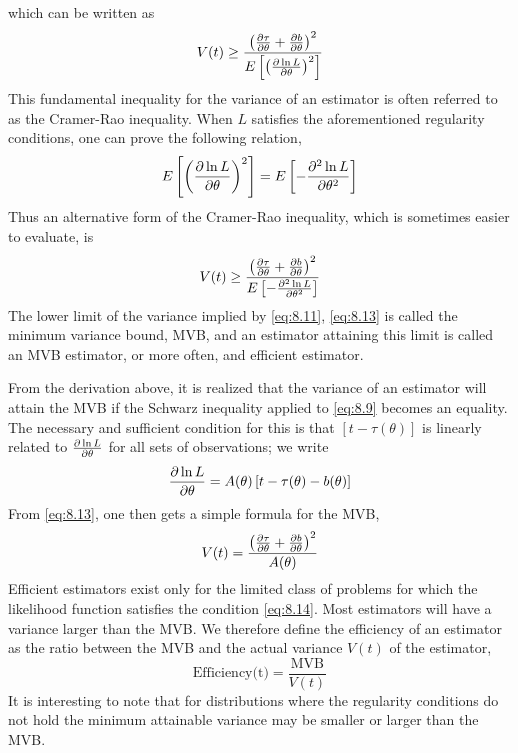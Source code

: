 \documentclass[../main.tex]{subfiles}
\begin{document}
%
which can be written as
%
\begin{equation}
    V(t)
    \geq \frac
    {\left( \frac{\partial \tau}{\partial \theta} + \frac{\partial b}{\partial \theta} \right)^2}
    {E\left[\left(\frac{\partial \ln L}{\partial \theta}\right)^2\right]}
    \label{eq:8.11}
\end{equation}
%
This fundamental inequality for the variance of an estimator is often referred to as the Cramer-Rao inequality.
When $L$ satisfies the aforementioned regularity conditions,
one can prove the following relation,
%
\begin{equation}
    E\left[\left(\frac{\partial \ln L}{\partial \theta}\right)^2\right]
    = E\left[-\frac{\partial^2 \ln L}{\partial \theta^2}\right]
    \label{eq:8.12}
\end{equation}
%
Thus an alternative form of the Cramer-Rao inequality,
which is sometimes easier to evaluate, is
%
\begin{equation}
    V(t)
    \geq \frac
    {\left( \frac{\partial \tau}{\partial \theta} + \frac{\partial b}{\partial \theta} \right)^2}
    {E\left[-\frac{\partial^2 \ln L}{\partial \theta^2}\right]}
    \label{eq:8.13}
\end{equation}
%
The lower limit of the variance implied by \eqref{eq:8.11}, \eqref{eq:8.13} is called the minimum variance bound, MVB,
and an estimator attaining this limit is called an MVB estimator,
or more often, and efficient estimator.

From the derivation above,
it is realized that the variance of an estimator will attain the MVB
if the Schwarz inequality applied to \eqref{eq:8.9} becomes an equality.
The necessary and sufficient condition for this
is that $[t-\tau(\theta)]$ is linearly related to $\frac{\partial \ln L}{\partial \theta}$ for all sets of observations;
we write
%
\begin{equation}
    \frac{\partial \ln L}{\partial \theta} = A(\theta) \left[ t - \tau(\theta) - b(\theta) \right]
    \label{eq:8.14}
\end{equation}
%
From \eqref{eq:8.13}, one then gets a simple formula for the MVB,
%
\begin{equation}
    V(t) = \frac
    {\left( \frac{\partial \tau}{\partial \theta} + \frac{\partial b}{\partial \theta} \right)^2}
    {A(\theta)}
    \label{eq:8.15}
\end{equation}
%
Efficient estimators exist only for the limited class of problems for which the likelihood function satisfies the condition \eqref{eq:8.14}.
Most estimators will have a variance larger than the MVB.
We therefore define the efficiency of an estimator as the ratio between the MVB and the actual variance $V(t)$ of the estimator,
%
\begin{equation}
    \text{Efficiency(t)} = \frac{\text{MVB}}{V(t)}
    \label{eq:8.16}
\end{equation}
%
It is interesting to note that
for distributions where the regularity conditions do not hold
the minimum attainable variance may be smaller or larger than the MVB.
\end{document}
